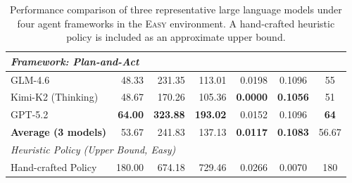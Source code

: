 \begin{table}[t]
{\begin{tabular}{lrrrrcc}
\multicolumn{7}{l}{\cellcolor{gray!20}\textit{Framework: Plan-and-Act}} \\
\midrule
GLM-4.6 & 48.33 & 231.35 & 113.01 & 0.0198 & 0.1096 & 55 \\
Kimi-K2 (Thinking) & 48.67 & 170.26 & 105.36 & \textbf{0.0000} & \textbf{0.1056} & 51 \\
GPT-5.2 & \textbf{64.00} & \textbf{323.88} & \textbf{193.02} & 0.0152 & 0.1096 & \textbf{64} \\
\midrule
\textbf{Average (3 models)} 
& 53.67 
& 241.83 
& 137.13 
& \textbf{0.0117} 
& \textbf{0.1083} 
& 56.67 \\
\midrule

\multicolumn{7}{l}{\cellcolor{gray!20}\textit{Heuristic Policy (Upper Bound, Easy)}} \\
\midrule
Hand-crafted Policy & 180.00 & 674.18 & 729.46 & 0.0266 & 0.0070 & 180 \\
\bottomrule
\end{tabular}
}
\caption{
Performance comparison of three representative large language models under four agent frameworks in the \textsc{Easy} environment. 
A hand-crafted heuristic policy is included as an approximate upper bound.
}
\label{tab:framework_stats}
\vspace{-5mm}
\end{table}
